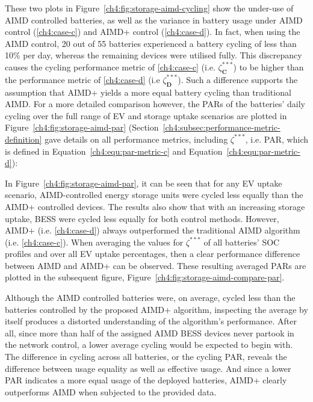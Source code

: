 

These two plots in Figure~\ref{ch4:fig:storage-aimd-cycling} show the under-use of AIMD controlled batteries, as well as the variance in battery usage under AIMD control (\ref{ch4:case-c}) and AIMD+ control (\ref{ch4:case-d}).
In fact, when using the AIMD control, 20 out of 55 batteries experienced a battery cycling of less than 10\% per day, whereas the remaining devices were utilised fully.
This discrepancy causes the cycling performance metric of \ref{ch4:case-c} (i.e. $\zeta_\textbf{C}^{***}$) to be higher than the performance metric of \ref{ch4:case-d} (i.e $\zeta_\textbf{D}^{***}$).
Such a difference supports the assumption that AIMD+ yields a more equal battery cycling than traditional AIMD.
For a more detailed comparison however, the PARs of the batteries' daily cycling over the full range of EV and storage uptake scenarios are plotted in Figure~\ref{ch4:fig:storage-aimd-par} (Section~\ref{ch4:subsec:performance-metric-definition} gave details on all performance metrics, including $\zeta^{***}$, i.e. PAR, which is defined in Equation~\ref{ch4:equ:par-metric-c} and Equation~\ref{ch4:equ:par-metric-d}):



In Figure~\ref{ch4:fig:storage-aimd-par}, it can be seen that for any EV uptake scenario, AIMD-controlled energy storage units were cycled less equally than the AIMD+ controlled devices.
The results also show that with an increasing storage uptake, BESS were cycled less equally for both control methods.
However, AIMD+ (i.e. \ref{ch4:case-d}) always outperformed the traditional AIMD algorithm (i.e. \ref{ch4:case-c}).
When averaging the values for $\zeta^{***}$ of all batteries' SOC profiles and over all EV uptake percentages, then a clear performance difference between AIMD and AIMD+ can be observed.
These resulting averaged PARs are plotted in the subsequent figure, Figure~\ref{ch4:fig:storage-aimd-compare-par}.



Although the AIMD controlled batteries were, on average, cycled less than the batteries controlled by the proposed AIMD+ algorithm, inspecting the average by itself produces a distorted understanding of the algorithm's performance.
After all, since more than half of the assigned AIMD BESS devices never partook in the network control, a lower average cycling would be expected to begin with.
The difference in cycling across all batteries, or the cycling PAR, reveals the difference between usage equality as well as effective usage.
And since a lower PAR indicates a more equal usage of the deployed batteries, AIMD+ clearly outperforms AIMD when subjected to the provided data.




